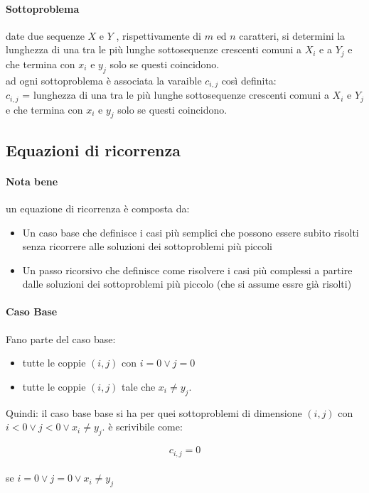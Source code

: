\documentclass[12pt, a4paper, openany]{book}
\begin{document}
\paragraph*{Sottoproblema} date due sequenze $X$ e $Y$ , rispettivamente di $m$ ed $n$ caratteri, si determini la lunghezza di una tra le più lunghe sottosequenze crescenti comuni
a $X_i$ e a $Y_j$ e che termina con $x_i$ e $y_j$ solo se questi coincidono.
\\ad ogni sottoproblema è associata la varaible $c_{i,j}$ così definita:
\\ $c_{i,j}$ = lunghezza di una tra le più lunghe sottosequenze crescenti comuni a $X_i$ e $Y_j$ e che termina con $x_i$ e $y_j$ solo se questi coincidono.


\subsection*{Equazioni di ricorrenza}
\paragraph*{Nota bene} %
un equazione di ricorrenza è composta da:
\begin{itemize}
	\item Un caso base che definisce i casi più semplici che possono essere subito risolti senza ricorrere alle soluzioni dei sottoproblemi più piccoli
	\item Un passo ricorsivo che definisce come risolvere i casi più complessi a partire dalle soluzioni dei sottoproblemi più piccolo (che si assume essre già risolti)
\end{itemize}

\paragraph*{Caso Base}
Fano parte del caso base:
\begin{itemize}
	\item tutte le coppie $(i,j)$ con $i = 0 \vee j= 0$
	\item tutte le coppie $(i,j)$ tale che $x_i \neq y_j$.
\end{itemize}
Quindi: il caso base base si ha per quei sottoproblemi di dimensione $(i,j)$ con $i < 0 \vee j < 0 \vee x_i \neq y_j$.
è scrivibile come:
\begin{center}
	$$c_{i,j} = 0$$
	\\se $i=0 \vee j=0 \vee x_i \neq y_j$
\end{center}
\end{document}
